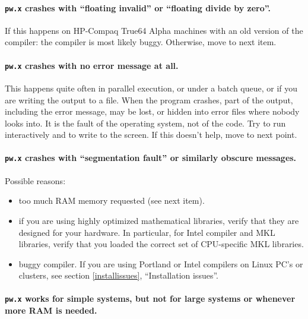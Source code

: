 \documentclass[12pt,a4paper]{article}
\begin{document}
\paragraph{\texttt{pw.x} crashes with ``floating invalid'' or 
``floating divide by zero''.}

If this happens on HP-Compaq True64 Alpha machines with an old
version of the compiler: the compiler is most likely buggy.
Otherwise, move to next item.

\paragraph{\texttt{pw.x} crashes with no error message at all.}

This happens quite often in parallel execution, or under a batch
queue, or if you are writing the output to a file.
When the program crashes, part of the output, including the error
message, may be lost, or hidden into error files where nobody looks
into.
It is the fault of the operating system, not of the code.
Try to run interactively and to write to the screen.
If this doesn't help, move to next point.

\paragraph{\texttt{pw.x} crashes with ``segmentation fault'' or
           similarly obscure messages.}

Possible reasons:
\begin{itemize}
  \item
    too much RAM memory requested (see next item).
  \item
    if you are using highly optimized mathematical libraries, verify
    that they are designed for your hardware.
    In particular, for Intel compiler and MKL libraries, verify that
    you loaded the correct set of CPU-specific MKL libraries.
  \item
    buggy compiler.
    If you are using Portland or Intel compilers on Linux PC's or
    clusters, see section \ref{installissues}, ``Installation
    issues''.
\end{itemize}

\paragraph{\texttt{pw.x} works for simple systems, but not for large
           systems or whenever more RAM is needed.}
\end{document}
